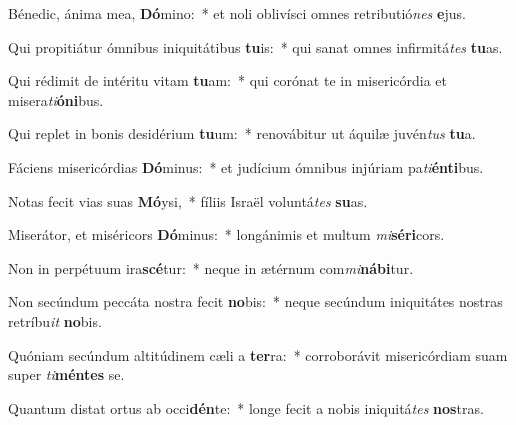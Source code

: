\item Bénedic, ánima mea, \textbf{Dó}mino:~* et noli oblivísci omnes retributió\textit{nes} \textbf{e}jus.
\item Qui propitiátur ómnibus iniquitátibus \textbf{tu}is:~* qui sanat omnes infirmitá\textit{tes} \textbf{tu}as.
\item Qui rédimit de intéritu vitam \textbf{tu}am:~* qui corónat te in misericórdia et misera\textit{ti}\textbf{ó}\textbf{ni}bus.
\item Qui replet in bonis desidérium \textbf{tu}um:~* renovábitur ut áquilæ juvén\textit{tus} \textbf{tu}a.
\item Fáciens misericórdias \textbf{Dó}minus:~* et judícium ómnibus injúriam pa\textit{ti}\textbf{én}\textbf{ti}bus.
\item Notas fecit vias suas \textbf{Mó}ysi,~* fíliis Israël voluntá\textit{tes} \textbf{su}as.
\item Miserátor, et miséricors \textbf{Dó}minus:~* longánimis et multum \textit{mi}\textbf{sé}\textbf{ri}cors.
\item Non in perpétuum ira\textbf{scé}tur:~* neque in ætérnum com\textit{mi}\textbf{ná}\textbf{bi}tur.
\item Non secúndum peccáta nostra fecit \textbf{no}bis:~* neque secúndum iniquitátes nostras retríbu\textit{it} \textbf{no}bis.
\item Quóniam secúndum altitúdinem cæli a \textbf{ter}ra:~* corroborávit misericórdiam suam super \textit{ti}\textbf{mén}\textbf{tes} se.
\item Quantum distat ortus ab occi\textbf{dén}te:~* longe fecit a nobis iniquitá\textit{tes} \textbf{nos}tras.
